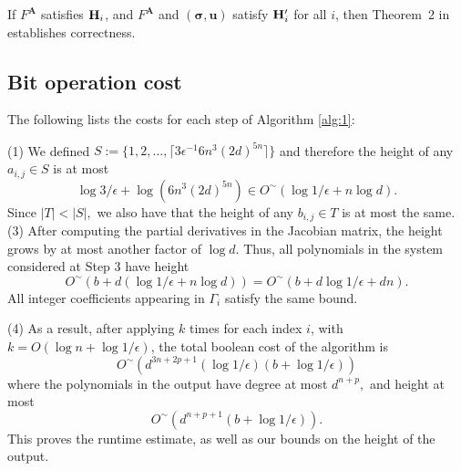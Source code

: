 \documentclass[a4paper]{article}
\def\mA{{\bm A}}
\def\ub{{\bm u}}
\DeclareMathOperator{\grad}{grad}
\begin{document}
\noindent 
If $F^\mA$ satisfies ${\bf H}_i$, and $F^\mA$ and
$(\bm \sigma,\ub)$ satisfy ${\bf H}'_i$ for all $i$, then
Theorem~2 in~\cite{EMP} establishes correctness.




\subsection{Bit operation cost} 
%
The following lists the costs for each step of Algorithm \ref{alg:1}:

\noindent
    (1) We defined $S := \{1,2,\hdots,\lceil 3\epsilon^{-1}6n^3(2d)^{5n} \rceil \}$
      and therefore the height of any $a_{i,j} \in S$ is at most
    \[
    \log 3/{\epsilon} + \log(6n^3(2d)^{5n}) \in O^{\sim}(\log 1/{\epsilon} + n\log d).
    \]
Since $|T| < |S|,$ we also have that the height of any $b_{i,j} \in T$ is at most the same.
\newline 
\noindent  
    (3)
    After computing the partial derivatives in the Jacobian matrix, the height grows by at
    most another factor of $\log d$. Thus, all polynomials in the
    system considered at Step 3 have height 
    \[
    O^{\sim}(b + d(\log 1 /
    \epsilon + n\log d))
    =
        O^{\sim}(b + d\log 1 /
    \epsilon + dn).
    \]
    All integer coefficients appearing in $\Gamma_i$ 
    satisfy the same bound.    
     
\noindent  
    (4)   
    As a result, after applying \cite[Algorithm 2]{SH} $k$ times
      for each index $i$, with $k = O(\log n + \log 1 / \epsilon)$,
      the total boolean cost of the algorithm is
  \[
O^{\sim}(d^{3n+2p+1}(\log1/\epsilon)(b + \log1/\epsilon))
  \]
      where the polynomials in the output have degree at most $d^{n+p},$ and height at most
  \[
O^{\sim}(d^{n+p+1}(b + \log1/\epsilon)).
  \]
\noindent
This proves the runtime estimate, as well as our bounds on the height
of the output.




\end{document}
